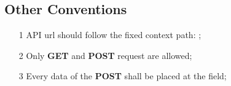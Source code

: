 {  \subsection*{Other Conventions}

  \begin{itemize}
	  \item[1] API url should follow the fixed context path: ;
	  \item[2] Only \textbf{GET} and \textbf{POST} request are allowed;
	  \item[3] Every data of the \textbf{POST} shall be placed at the  field;
  \end{itemize}
 }


